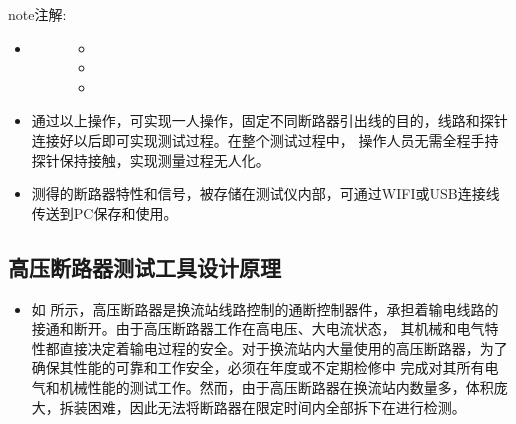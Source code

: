 \documentclass[a4paper,10pt,english]{sphinxmanual}
\begin{document}
\begin{sphinxadmonition}{note}{注解:}\begin{itemize}
\item {} \begin{description}
\item[{}] \leavevmode\begin{itemize}
\item {} 
\sphinxAtStartPar
{}

\item {} 
\sphinxAtStartPar
{}

\item {} 
\sphinxAtStartPar
{}

\end{itemize}

\end{description}

\end{itemize}
\end{sphinxadmonition}
\begin{itemize}
\item {} 
\sphinxAtStartPar
通过以上操作，可实现一人操作，固定不同断路器引出线的目的，线路和探针连接好以后即可实现测试过程。在整个测试过程中，
操作人员无需全程手持探针保持接触，实现测量过程无人化。

\item {} 
\sphinxAtStartPar
测得的断路器特性和信号，被存储在测试仪内部，可通过WIFI或USB连接线传送到PC保存和使用。

\end{itemize}


\subsection{高压断路器测试工具设计原理}
\label{\detokenize{work_principle:id3}}\begin{itemize}
\item {} 
\sphinxAtStartPar
如  所示，高压断路器是换流站线路控制的通断控制器件，承担着输电线路的接通和断开。由于高压断路器工作在高电压、大电流状态，
其机械和电气特性都直接决定着输电过程的安全。对于换流站内大量使用的高压断路器，为了确保其性能的可靠和工作安全，必须在年度或不定期检修中
完成对其所有电气和机械性能的测试工作。然而，由于高压断路器在换流站内数量多，体积庞大，拆装困难，因此无法将断路器在限定时间内全部拆下在进行检测。

\end{itemize}
\end{document}
